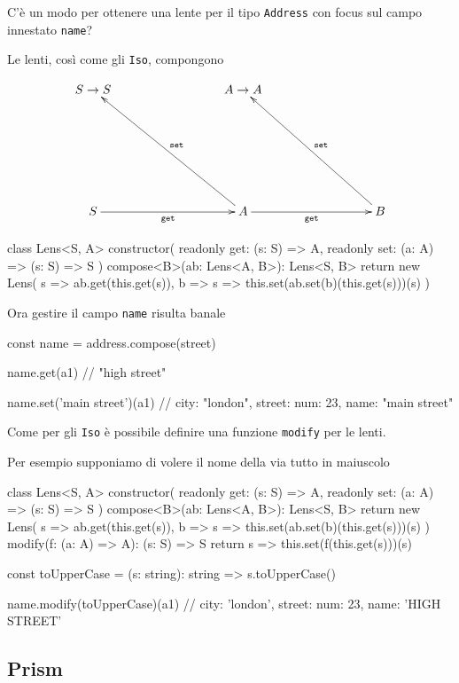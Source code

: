 \documentclass[12pt]{article}
\theoremstyle{definition}
\newenvironment{code}
  {\vspace{0.5cm} \VerbatimEnvironment\begin{typescriptcode}}
  {\end{typescriptcode} \vspace{0.2cm}}
\begin{document}
C'è un modo per ottenere una lente per il tipo \texttt{Address} con focus sul campo innestato \texttt{name}?

Le lenti, così come gli \texttt{Iso}, compongono

\[
\xymatrixrowsep{3cm}
\xymatrixcolsep{3cm}
\xymatrix{
  {S \rightarrow S} & {A \rightarrow A} \\
  S \ar[r]_{\texttt{get}} & A \ar[lu]_{\texttt{set}} \ar[r]_{\texttt{get}} & B \ar[lu]_{\texttt{set}}
}
\]

\begin{code}
class Lens<S, A> {
  constructor(
    readonly get: (s: S) => A,
    readonly set: (a: A) => (s: S) => S
  ) {}
  compose<B>(ab: Lens<A, B>): Lens<S, B> {
    return new Lens(
      s => ab.get(this.get(s)),
      b => s => this.set(ab.set(b)(this.get(s)))(s)
    )
  }
}
\end{code}

Ora gestire il campo \texttt{name} risulta banale

\begin{code}
const name = address.compose(street)

name.get(a1)
// "high street"

name.set('main street')(a1)
// { city: "london", street: { num: 23, name: "main street" } }
\end{code}

Come per gli \texttt{Iso} è possibile definire una funzione \texttt{modify} per le lenti.

Per esempio supponiamo di volere il nome della via tutto in maiuscolo

\begin{code}
class Lens<S, A> {
  constructor(
    readonly get: (s: S) => A,
    readonly set: (a: A) => (s: S) => S
  ) {}
  compose<B>(ab: Lens<A, B>): Lens<S, B> {
    return new Lens(
      s => ab.get(this.get(s)),
      b => s => this.set(ab.set(b)(this.get(s)))(s)
    )
  }
  modify(f: (a: A) => A): (s: S) => S {
    return s => this.set(f(this.get(s)))(s)
  }
}

const toUpperCase = (s: string): string => s.toUpperCase()

name.modify(toUpperCase)(a1)
// { city: 'london', street: { num: 23, name: 'HIGH STREET' } }
\end{code}

\subsection{Prism}
\end{document}
